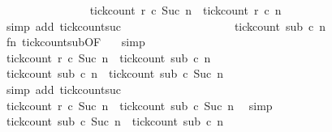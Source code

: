 \begin{isabellebody}
\ \ \ \ \ \ \ \ \ \ \ \ \ \ \isamarkupfalse%
\ {\isacartoucheopen}tick{\isacharunderscore}count\ r\ c\ {\isacharparenleft}Suc\ n{\isacharparenright}\ {\isacharequal}\ tick{\isacharunderscore}count\ r\ c\ n{\isacartoucheclose}\ \isamarkupfalse%
\ {\isacharparenleft}simp\ add{\isacharcolon}\ tick{\isacharunderscore}count{\isacharunderscore}suc{\isacharparenright}\isanewline
\ \ \ \ \ \ \ \ \ \ \ \ \ \ \isamarkupfalse%
\ \isamarkupfalse%
\ {\isacartoucheopen}{\isachardot}{\isachardot}{\isachardot}\ {\isacharequal}\ tick{\isacharunderscore}count\ sub\ c\ n\ \isamarkupfalse%
\ fn\ tick{\isacharunderscore}count{\isacharunderscore}sub{\isacharbrackleft}OF\ {\isacharasterisk}{\isacharbrackright}\ \isamarkupfalse%
\ simp\isanewline
\ \ \ \ \ \ \ \ \ \ \ \ \ \ \isamarkupfalse%
\ \isamarkupfalse%
\ {\isacartoucheopen}tick{\isacharunderscore}count\ r\ c\ {\isacharparenleft}Suc\ n{\isacharparenright}\ {\isacharequal}\ tick{\isacharunderscore}count\ sub\ c\ n\ \isacommand{{\isachardot}}\isamarkupfalse%
\isanewline
\ \ \ \ \ \ \ \ \ \ \ \ \ \ \isamarkupfalse%
\ \isamarkupfalse%
\ {\isacartoucheopen}tick{\isacharunderscore}count\ sub\ c\ n\ {\isasymle}\ tick{\isacharunderscore}count\ sub\ c\ {\isacharparenleft}Suc\ n\isanewline
\ \ \ \ \ \ \ \ \ \ \ \ \ \ \ \ \isamarkupfalse%
\ {\isacharparenleft}simp\ add{\isacharcolon}\ tick{\isacharunderscore}count{\isacharunderscore}suc{\isacharparenright}\isanewline
\ \ \ \ \ \ \ \ \ \ \ \ \ \ \isamarkupfalse%
\ \isamarkupfalse%
\ {\isacartoucheopen}tick{\isacharunderscore}count\ r\ c\ {\isacharparenleft}Suc\ n{\isacharparenright}\ {\isasymle}\ tick{\isacharunderscore}count\ sub\ c\ {\isacharparenleft}Suc\ n\ \isamarkupfalse%
\ simp\isanewline
\ \ \ \ \ \ \ \ \ \ \ \ \ \ \isamarkupfalse%
\ \isamarkupfalse%
\ {\isacartoucheopen}tick{\isacharunderscore}count\ sub\ c\ {\isacharparenleft}Suc\ n\ {\isasymle}\ tick{\isacharunderscore}count\ sub\ c\ n\ \isamarkupfalse%

\end{isabellebody}

